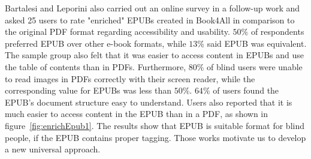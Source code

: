 Bartalesi and Leporini \cite{enrichEPUB} also carried out an online survey in a follow-up work and asked 25 users to rate "enriched" EPUBs created in Book4All in comparison to the original PDF format regarding accessibility and usability. $50\%$ of respondents preferred EPUB over other e-book formats, while $13\%$ said EPUB was equivalent.
The sample group also felt that it was easier to access content in EPUBs and use the table of contents than in PDFs.
Furthermore, $80\%$ of blind users were unable to read images in PDFs correctly with their screen reader, while the corresponding value for EPUBs was less than $50\%$. $64\%$ of users found the EPUB's document structure easy to understand. Users also reported that it is much easier to access content in the EPUB than in a PDF, as shown in figure~\ref{fig:enrichEpub1}.  The results show that EPUB is suitable format for blind people, if the EPUB contains proper tagging. 
Those works motivate us to develop a new universal approach.

